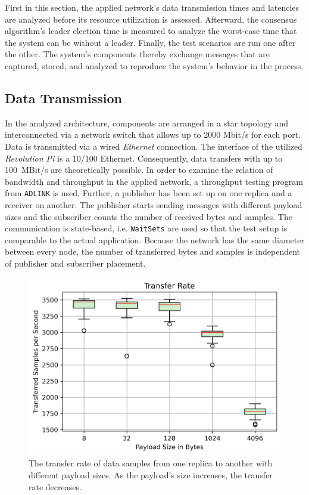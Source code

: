 First in this section, the applied network's data transmission times and latencies are analyzed before its resource utilization is assessed.
Afterward, the consensus algorithm's leader election time is measured to analyze the worst-case time that the system can be without a leader.
Finally, the test scenarios are run one after the other.
The system's components thereby exchange messages that are captured, stored, and analyzed to reproduce the system's behavior in the process.

\subsection{Data Transmission}

In the analyzed architecture, components are arranged in a star topology and interconnected via a network switch that allows up to 2000 Mbit/s for each port.
Data is transmitted via a wired \textit{Ethernet} connection.
The interface of the utilized \textit{Revolution Pi} is a 10/100 Ethernet.
Consequently, data transfers with up to 100~MBit/s are theoretically possible.
In order to examine the relation of bandwidth and throughput in the applied network, a  throughput testing program from \texttt{ADLINK} is used.
Further, a publisher has been set up on one replica and a receiver on another.
The publisher starts sending messages with different payload sizes and the subscriber counts the number of received bytes and samples.
The communication is state-based, i.e. \texttt{WaitSets} are used so that the test setup is comparable to the actual application.
Because the network has the same diameter between every node, the number of transferred bytes and samples is independent of publisher and subscriber placement.

\begin{figure}[!hbt]
	\centering
	\includegraphics[width=0.8\linewidth]{images/plots/transferRate}
	\caption{The transfer rate of data samples from one replica to another with different payload sizes. As the payload's size increases, the transfer rate decreases.}
	\label{fig:PlotTransferRate}
\end{figure}

